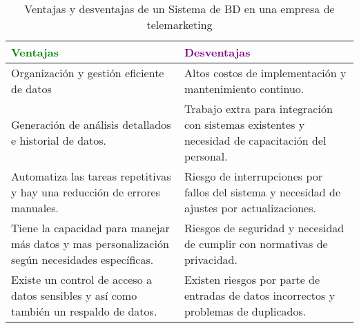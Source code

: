 \begin{table}[h!]
    \centering
    \begin{tabular}{|p{6cm}||p{6cm}|}
        \hline
        \textcolor{green}{\textbf{Ventajas}} & \textcolor{purple}{\textbf{Desventajas}} \\ \hline
        Organización y gestión eficiente de datos & Altos costos de implementación y mantenimiento continuo. \\ \hline
        Generación de análisis detallados e historial de datos. & Trabajo extra para integración con sistemas existentes y necesidad de capacitación del personal. \\ \hline
         Automatiza las tareas repetitivas y hay una reducción de errores manuales. & Riesgo de interrupciones por fallos del sistema y necesidad de ajustes por actualizaciones. \\ \hline
        Tiene la capacidad para manejar más datos y mas personalización según necesidades específicas. &  Riesgos de seguridad y necesidad de cumplir con normativas de privacidad. \\ \hline
        Existe un control de acceso a datos sensibles y así como también un respaldo de datos. & Existen riesgos por parte de entradas de datos incorrectos y problemas de duplicados. \\ \hline
    \end{tabular}
    \caption{Ventajas y desventajas de un Sistema de BD en una empresa de telemarketing}
    \cite{adSalsa_2024}
\end{table}
